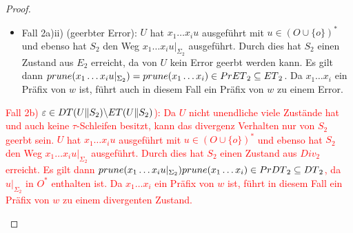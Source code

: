 \begin{proof}
\begin{itemize}
\begin{itemize}
\begin{itemize}
              $q_{02} \overset{x_1\dots x_i}{\Rightarrow} q'
              \overset{x_{i+1}}{\not{\hspace{-0.1cm}\rightarrow}}$ und damit
              gilt $x_1\dots x_{i+1}\in \MIT{}_2\subseteq \ET{}_2$. Somit ist
              ein Präfix von $w$ in $\ET{}_2$ enthalten.
            \item Fall 2a)ii) (geerbter Error): $U$ hat $x_1\dots x_iu$
              ausgeführt mit $u\in (O\cup\{o\})^*$ und ebenso hat $S_2$ den
              Weg $x_1\dots x_iu|_{\Sigma _2}$ ausgeführt. Durch dies hat $S_2$ einen
              Zustand aus $E_2$ erreicht, da von $U$ kein Error geerbt werden
              kann. Es gilt dann $prune{}(x_1\dots x_iu|_{\Sigma _2})=
              prune{}(x_1\dots x_i)\in PrET{}_2\subseteq ET{}_2$. Da
              $x_1\dots x_i$ ein Präfix von $w$ ist, führt auch in diesem Fall
              ein Präfix von $w$ zu einem Error.
          \end{itemize}
        \textcolor{red}{\item Fall 2b) $\varepsilon\in DT{}(U\|S_2)\backslash ET{}(U\|S_2)$):
          Da $U$ nicht unendliche viele Zustände hat und auch keine
          $\tau$-Schleifen besitzt, kann das divergenz Verhalten nur von $S_2$
          geerbt sein. $U$ hat $x_1\dots x_iu$ ausgeführt mit $u\in (O\cup
          \{o\})^*$ und ebenso hat $S_2$ den Weg $x_1\dots x_iu|_{\Sigma _2}$
          ausgeführt. Durch dies hat $S_2$ einen Zustand aus $Div_2$
          erreicht. Es gilt dann $prune{}(x_1\dots x_iu|_{\Sigma
          _2})prune{}(x_1\dots x_i)\in PrDT{}_2\subseteq DT{}_2$, da
          $u|_{\Sigma _2}$ in $O^*$ enthalten ist. Da $x_1\dots x_i$ ein Präfix
          von $w$ ist, führt in diesem Fall ein Präfix von $w$ zu einem
        divergenten Zustand.}
      \end{itemize}
  \end{itemize}


\end{proof}
